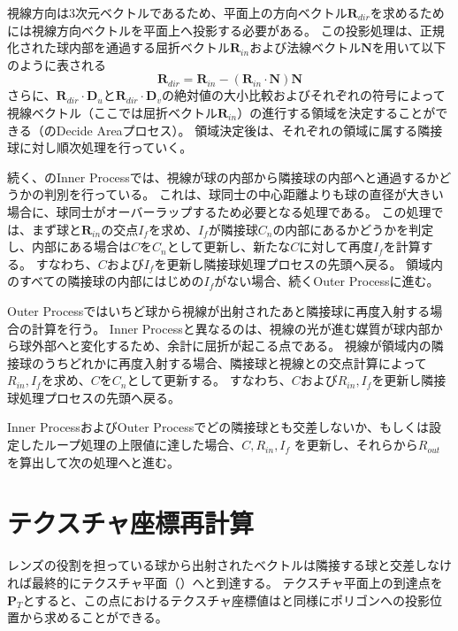 視線方向は3次元ベクトルであるため、平面上の方向ベクトル$\bm{R}_{dir}$を求めるためには視線方向ベクトルを平面上へ投影する必要がある。
この投影処理は、正規化された球内部を通過する屈折ベクトル$\bm{R}_{in}$および法線ベクトル$\bm{N}$を用いて以下のように表される
\begin{equation}
\label{ERdir}
\bm{R}_{dir} = \bm{R}_{in} - ( \bm{R}_{in} \cdot \bm{N} )\bm{N}
\end{equation}
さらに、$\bm{R}_{dir} \cdot \bm{D}_{u}$と$\bm{R}_{dir} \cdot \bm{D}_{v}$の絶対値の大小比較およびそれぞれの符号によって視線ベクトル（ここでは屈折ベクトル$\bm{R}_{in}$）の進行する領域を決定することができる（のDecide Areaプロセス）。
領域決定後は、それぞれの領域に属する隣接球に対し順次処理を行っていく。

続く、のInner Processでは、視線が球の内部から隣接球の内部へと通過するかどうかの判別を行っている。
これは、球同士の中心距離よりも球の直径が大きい場合に、球同士がオーバーラップするため必要となる処理である。
この処理では、まず球と$\bm{R}_{in}$の交点$I_f$を求め、$I_f$が隣接球$C_n$の内部にあるかどうかを判定し、内部にある場合は$C$を$C_n$として更新し、新たな$C$に対して再度$I_f$を計算する。
すなわち、$C$および$I_f$を更新し隣接球処理プロセスの先頭へ戻る。
領域内のすべての隣接球の内部にはじめの$I_f$がない場合、続くOuter Processに進む。

Outer Processではいちど球から視線が出射されたあと隣接球に再度入射する場合の計算を行う。
Inner Processと異なるのは、視線の光が進む媒質が球内部から球外部へと変化するため、余計に屈折が起こる点である。
視線が領域内の隣接球のうちどれかに再度入射する場合、隣接球と視線との交点計算によって$R_{in}, I_f$を求め、$C$を$C_n$として更新する。
すなわち、$C$および$R_{in}, I_f$を更新し隣接球処理プロセスの先頭へ戻る。

Inner ProcessおよびOuter Processでどの隣接球とも交差しないか、もしくは設定したループ処理の上限値に達した場合、$C, R_{in}, I_f$
を更新し、それらから$R_{out}$を算出して次の処理へと進む。

\section{テクスチャ座標再計算}
\label{STexturerecalculation}

レンズの役割を担っている球から出射されたベクトルは隣接する球と交差しなければ最終的にテクスチャ平面（）へと到達する。
テクスチャ平面上の到達点を$\bm{P}_T$とすると、この点におけるテクスチャ座標値はと同様にポリゴンへの投影位置から求めることができる。

